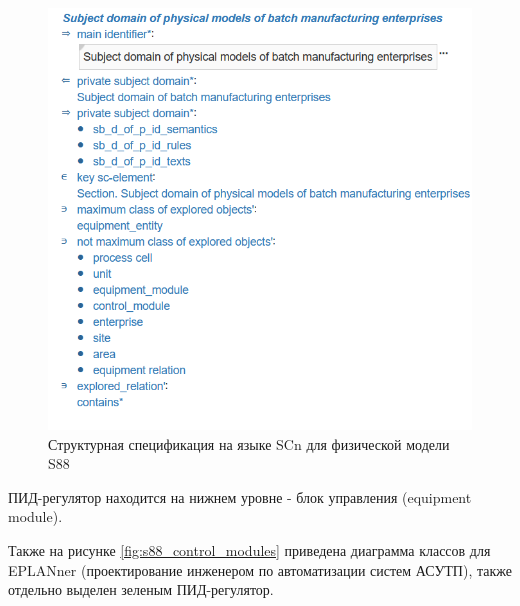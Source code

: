 \begin{figure}[H]
    \centering
    \includegraphics[width=\textwidth]{images/chapter_4/s88_physical_result_ontology.png}
    \caption{Структурная спецификация на языке SCn для физической модели S88}
    \label{fig:s88_physical_result_ontology}
\end{figure}

ПИД-регулятор находится на нижнем уровне - блок управления (equipment module).

Также на рисунке \ref{fig:s88_control_modules} приведена диаграмма классов для EPLANner (проектирование инженером по автоматизации систем АСУТП), также отдельно выделен зеленым ПИД-регулятор.

